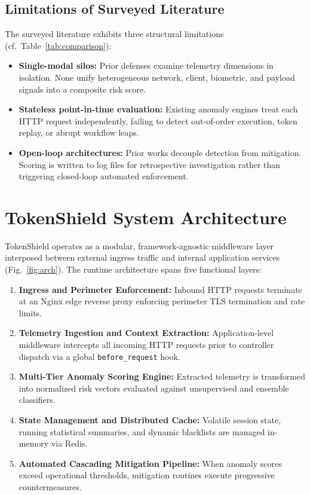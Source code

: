 \documentclass[conference]{IEEEtran}
\begin{document}
\subsection{Limitations of Surveyed Literature}
The surveyed literature exhibits three structural limitations (cf.\ Table~\ref{tab:comparison}):
\begin{itemize}
    \item \textbf{Single-modal silos:} Prior defenses examine telemetry dimensions in isolation. None unify heterogeneous network, client, biometric, and payload signals into a composite risk score.
    \item \textbf{Stateless point-in-time evaluation:} Existing anomaly engines treat each HTTP request independently, failing to detect out-of-order execution, token replay, or abrupt workflow leaps.
    \item \textbf{Open-loop architectures:} Prior works decouple detection from mitigation. Scoring is written to log files for retrospective investigation rather than triggering closed-loop automated enforcement.
\end{itemize}

\section{TokenShield System Architecture}

TokenShield operates as a modular, framework-agnostic middleware layer interposed between external ingress traffic and internal application services (Fig.~\ref{fig:arch}). The runtime architecture spans five functional layers:
\begin{enumerate}
    \item \textbf{Ingress and Perimeter Enforcement:} Inbound HTTP requests terminate at an Nginx edge reverse proxy enforcing perimeter TLS termination and rate limits.
    \item \textbf{Telemetry Ingestion and Context Extraction:} Application-level middleware intercepts all incoming HTTP requests prior to controller dispatch via a global \texttt{before\_request} hook.
    \item \textbf{Multi-Tier Anomaly Scoring Engine:} Extracted telemetry is transformed into normalized risk vectors evaluated against unsupervised and ensemble classifiers.
    \item \textbf{State Management and Distributed Cache:} Volatile session state, running statistical summaries, and dynamic blacklists are managed in-memory via Redis.
    \item \textbf{Automated Cascading Mitigation Pipeline:} When anomaly scores exceed operational thresholds, mitigation routines execute progressive countermeasures.
\end{enumerate}
\end{document}

